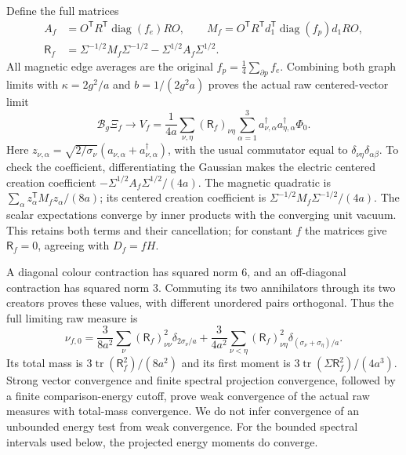 Define the full matrices
\begin{align}
 A_f&=O^{\mathsf T}R^{\mathsf T}\operatorname{diag}(f_e)RO,
 \qquad
 M_f=O^{\mathsf T}R^{\mathsf T}d_1^{\mathsf T}
                  \operatorname{diag}(f_p)d_1RO, \nonumber\\
 \mathsf R_f&=\Sigma^{-1/2}M_f\Sigma^{-1/2}
                   -\Sigma^{1/2}A_f\Sigma^{1/2}. \label{eq:low-pair}
\end{align}
All magnetic edge averages are the original $f_p=\frac14\sum_{\partial p}f_e$.
Combining both graph limits with $\kappa=2g^2/a$ and $b=1/(2g^2a)$
proves the actual raw centered-vector limit
\begin{equation}\label{eq:low-vector}
 \mathcal B_g\Xi_f\longrightarrow
 V_f=\frac1{4a}\sum_{\nu,\eta}(\mathsf R_f)_{\nu\eta}
       \sum_{\alpha=1}^3
       a_{\nu,\alpha}^\dagger a_{\eta,\alpha}^\dagger\Phi_0 .
\end{equation}
Here $z_{\nu,\alpha}=\sqrt{2/\sigma_\nu}
(a_{\nu,\alpha}+a_{\nu,\alpha}^\dagger)$, with the usual commutator
equal to $\delta_{\nu\eta}\delta_{\alpha\beta}$.
To check the coefficient, differentiating the Gaussian makes the
electric centered creation coefficient $-\Sigma^{1/2}A_f\Sigma^{1/2}/(4a)$.
The magnetic quadratic is $\sum_\alpha z_\alpha^{\mathsf T}M_fz_\alpha/(8a)$;
its centered creation coefficient is
$\Sigma^{-1/2}M_f\Sigma^{-1/2}/(4a)$.
The scalar expectations converge by inner products with the converging
unit vacuum. This retains both terms and their cancellation; for constant
$f$ the matrices give $\mathsf R_f=0$, agreeing with $D_f=fH$.

A diagonal colour contraction has squared norm $6$, and an
off-diagonal contraction has squared norm $3$. Commuting its two
annihilators through its two creators proves these values, with
different unordered pairs orthogonal. Thus the full limiting raw measure is
\begin{equation}\label{eq:low-full-measure}
 \nu_{f,0}=\frac3{8a^2}\sum_\nu(\mathsf R_f)_{\nu\nu}^2
                       \delta_{2\sigma_\nu/a}
 +\frac3{4a^2}\sum_{\nu<\eta}(\mathsf R_f)_{\nu\eta}^2
                       \delta_{(\sigma_\nu+\sigma_\eta)/a}.
\end{equation}
Its total mass is $3\operatorname{tr}(\mathsf R_f^2)/(8a^2)$ and its
first moment is $3\operatorname{tr}(\Sigma\mathsf R_f^2)/(4a^3)$.
Strong vector convergence and finite spectral projection convergence,
followed by a finite comparison-energy cutoff, prove weak convergence
of the actual raw measures with total-mass convergence. We do not
infer convergence of an unbounded energy test from weak convergence.
For the bounded spectral intervals used below, the projected
energy moments do converge.

